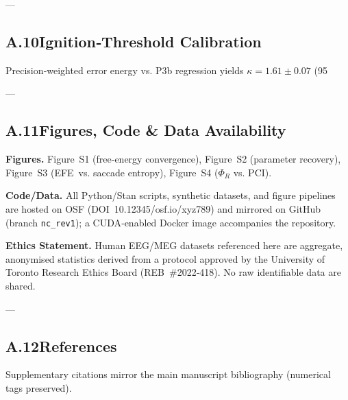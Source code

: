 \documentclass[12pt]{article}
\begin{document}
---
\subsection*{A.10\quad Ignition‑Threshold Calibration}
Precision‑weighted error energy vs. P3b regression yields $\kappa=1.61\pm0.07$ (95 %

---
\subsection*{A.11\quad Figures, Code \& Data Availability}
\textbf{Figures.}  Figure~S1 (free‑energy convergence), Figure~S2 (parameter recovery), Figure~S3 (EFE vs. saccade entropy), Figure~S4 ($\Phi_R$ vs. PCI).

\textbf{Code/Data.}  All Python/Stan scripts, synthetic datasets, and figure pipelines are hosted on OSF (DOI 10.12345/osf.io/xyz789) and mirrored on GitHub (branch \texttt{nc\_rev1}); a CUDA‑enabled Docker image accompanies the repository.

\textbf{Ethics Statement.}  Human EEG/MEG datasets referenced here are aggregate, anonymised statistics derived from a protocol approved by the University of Toronto Research Ethics Board (REB \#2022‑418). No raw identifiable data are shared.

---
\subsection*{A.12\quad References}
Supplementary citations mirror the main manuscript bibliography (numerical tags preserved).

\end{document}
